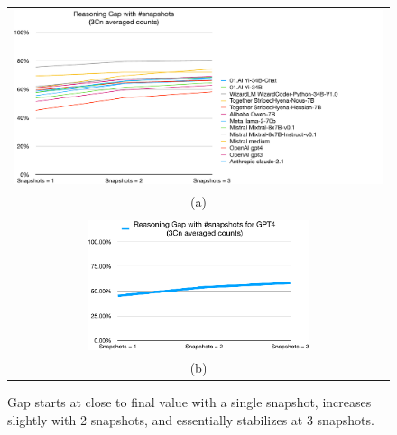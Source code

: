 \documentclass[11pt,a4paper]{article}
\begin{document}
\begin{figure}
  \begin{tabular}{c}
    \includegraphics[width=\textwidth]{oss-k=3-suffices}\\
    (a)\\\\
    \includegraphics[width=0.6\textwidth]{gpt4-k=3-suffices}\\
    (b)
  \end{tabular}
  \caption{\label{fig:gap-stabilizes-k-3} Gap starts at close to final value with a single snapshot, increases slightly with 2 snapshots, and essentially stabilizes at 3 snapshots.}
\end{figure}
\end{document}
